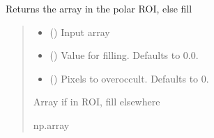 \documentclass[letterpaper,10pt,english]{sphinxmanual}
\begin{document}
\begin{fulllineitems}
\begin{fulllineitems}
\begin{quote}
\begin{description}
\end{description}\end{quote}

\end{fulllineitems}


\begin{fulllineitems}
\label{\detokenize{micropolarray:micropolarray.cameras.Camera.occulter_roi}}
\pysigstartsignatures
{}
\pysigstopsignatures
\sphinxAtStartPar
Returns the array in the polar ROI, else fill
\begin{quote}\begin{description}
\begin{itemize}
\item {} 
\sphinxAtStartPar
{} () \textendash{} Input array

\item {} 
\sphinxAtStartPar
{} (\sphinxstyleliteralemphasis{\sphinxupquote{, }}) \textendash{} Value for filling. Defaults to 0.0.

\item {} 
\sphinxAtStartPar
{} (\sphinxstyleliteralemphasis{\sphinxupquote{, }}) \textendash{} Pixels to overoccult. Defaults to 0.

\end{itemize}

\sphinxAtStartPar
Array if in ROI, fill elsewhere

\sphinxAtStartPar
np.array

\end{description}\end{quote}

\end{fulllineitems}


\end{fulllineitems}
\end{document}
